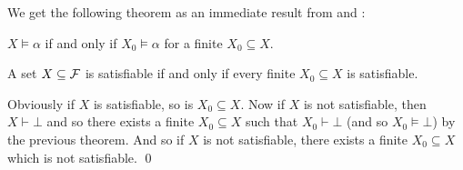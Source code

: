 We get the following theorem as an immediate result from  and :

\bthrm

    $X\vDash\alpha$ if and only if $X_0\vDash\alpha$ for a finite $X_0\subseteq X$.

\ethrm

\bthrm[title=The Compactness Theorem, name=propcompactthrm]

    A set $X\subseteq{\cal F}$ is satisfiable if and only if every finite $X_0\subseteq X$ is satisfiable.

\ethrm

Obviously if $X$ is satisfiable, so is $X_0\subseteq X$.
Now if $X$ is not satisfiable, then $X\vdash\bot$ and so there exists a finite $X_0\subseteq X$ such that $X_0\vdash\bot$ (and so $X_0\vDash\bot$) by the previous theorem.
And so if $X$ is not satisfiable, there exists a finite $X_0\subseteq X$ which is not satisfiable.
\qed



